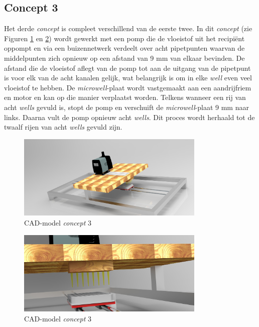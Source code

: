 \documentclass[a4paper,twoside,kulak]{kulakreport} %
\begin{document}
\subsection{Concept 3}
Het derde \textit{concept} is compleet verschillend van de eerste twee. In dit \textit{concept} (zie Figuren \ref{fig: CAD-model globaal} en \ref{fig: CAD-model ingezoomd}) wordt gewerkt met een pomp die de vloeistof uit het recipiënt oppompt en via een buizennetwerk verdeelt over acht pipetpunten waarvan de middelpunten zich opnieuw op een afstand van 9 mm van elkaar bevinden. De afstand die de vloeistof aflegt van de pomp tot aan de uitgang van de pipetpunt is voor elk van de acht kanalen gelijk, wat belangrijk is om in elke \textit{well} even veel vloeistof te hebben. De \textit{microwell}-plaat wordt vastgemaakt aan een aandrijfriem en motor en kan op die manier verplaatst worden. Telkens wanneer een rij van acht \textit{wells} gevuld is, stopt de pomp en verschuift de \textit{microwell}-plaat 9 mm naar links. Daarna vult de pomp opnieuw acht \textit{wells}. Dit proces wordt herhaald tot de twaalf rijen van acht \textit{wells} gevuld zijn. 

\begin{figure}[h]
	\centering
	\includegraphics[width=0.8\textwidth]{micdis1.jpg}
	\caption{CAD-model \textit{concept} 3}
	\label{fig: CAD-model globaal}
	
\end{figure} 

\begin{figure}[h]
	\centering
	\includegraphics[width=0.8\textwidth]{micdis2.jpg}
	\caption{CAD-model \textit{concept} 3}
	\label{fig: CAD-model ingezoomd}
	
\end{figure} 
\end{document}
